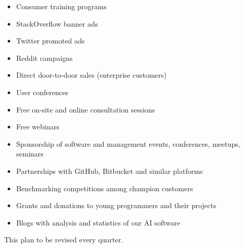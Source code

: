 \documentclass[12pt]{article}
\begin{document}
\begin{itemize}
  \item Consumer training programs
  \item StackOverflow banner ads
  \item Twitter promoted ads
  \item Reddit campaigns
  \item Direct door-to-door sales (enterprise customers)
  \item User conferences
  \item Free on-site and online consultation sessions
  \item Free webinars
  \item Sponsorship of software and management events, conferences, meetups, seminars
  \item Partnerships with GitHub, Bitbucket and similar platforms
  \item Benchmarking competitions among champion customers
  \item Grants and donations to young programmers and their projects
  \item Blogs with analysis and statistics of our AI software
\end{itemize}

This plan to be revised every quarter.
\end{document}
